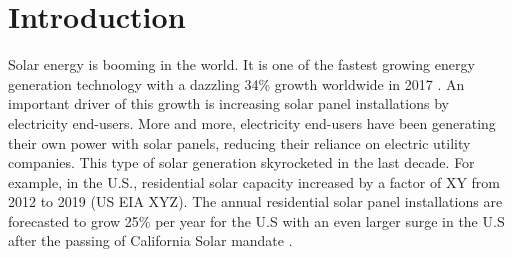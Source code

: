\documentclass[msom,blindrev]{informs3}
\begin{document}
\maketitle

%


\section{Introduction}

Solar energy is booming in the world. It is one of the fastest growing energy generation technology with a dazzling 34\% growth worldwide in 2017 \citep{iea2018snapshot}. An important driver of this growth is increasing solar panel installations by electricity end-users. More and more, electricity end-users have been generating their own power with solar panels, reducing their reliance on electric utility companies. This type of solar generation skyrocketed in the last decade. For example, in the U.S., residential solar capacity increased by a factor of XY from 2012 to 2019 (US EIA XYZ). The annual residential solar panel installations are forecasted to grow 25\% per year for the U.S \citep{weaver_2019,seia} with an even larger surge in the U.S after the passing of California Solar mandate \citep{gtmsolar2018}.
\end{document}
